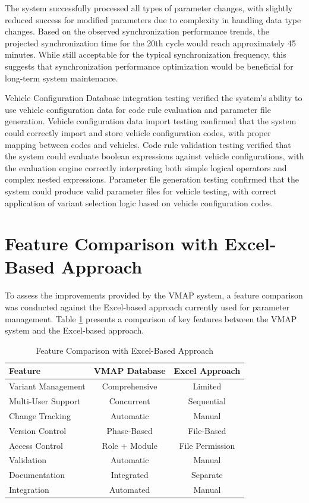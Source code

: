 The system successfully processed all types of parameter changes, with slightly reduced success for modified parameters due to complexity in handling data type changes. Based on the observed synchronization performance trends, the projected synchronization time for the 20th cycle would reach approximately 45 minutes. While still acceptable for the typical synchronization frequency, this suggests that synchronization performance optimization would be beneficial for long-term system maintenance.

Vehicle Configuration Database integration testing verified the system's ability to use vehicle configuration data for code rule evaluation and parameter file generation. Vehicle configuration data import testing confirmed that the system could correctly import and store vehicle configuration codes, with proper mapping between codes and vehicles. Code rule validation testing verified that the system could evaluate boolean expressions against vehicle configurations, with the evaluation engine correctly interpreting both simple logical operators and complex nested expressions. Parameter file generation testing confirmed that the system could produce valid parameter files for vehicle testing, with correct application of variant selection logic based on vehicle configuration codes.

\section{Feature Comparison with Excel-Based Approach}
\label{sec:feature-comparison-excel}

To assess the improvements provided by the \ac{VMAP} system, a feature comparison was conducted against the Excel-based approach currently used for parameter management. Table \ref{tab:feature-comparison} presents a comparison of key features between the \ac{VMAP} system and the Excel-based approach.

\begin{table}[h]
\centering
\caption{Feature Comparison with Excel-Based Approach}
\label{tab:feature-comparison}
\begin{tabular}{|l|c|c|}
\hline
\textbf{Feature} & \textbf{VMAP Database} & \textbf{Excel Approach} \\
\hline
Variant Management & Comprehensive & Limited \\
\hline
Multi-User Support & Concurrent & Sequential \\
\hline
Change Tracking & Automatic & Manual \\
\hline
Version Control & Phase-Based & File-Based \\
\hline
Access Control & Role + Module & File Permission \\
\hline
Validation & Automatic & Manual \\
\hline
Documentation & Integrated & Separate \\
\hline
Integration & Automated & Manual \\
\hline
\end{tabular}
\end{table}

